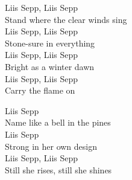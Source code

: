 \begin{lyrics}
Liis Sepp, Liis Sepp\\
Stand where the clear winds sing\\
Liis Sepp, Liis Sepp\\
Stone-sure in everything\\
Liis Sepp, Liis Sepp\\
Bright as a winter dawn\\
Liis Sepp, Liis Sepp\\
Carry the flame on

Liis Sepp\\
Name like a bell in the pines\\
Liis Sepp\\
Strong in her own design\\
Liis Sepp, Liis Sepp\\
Still she rises, still she shines
\end{lyrics}

